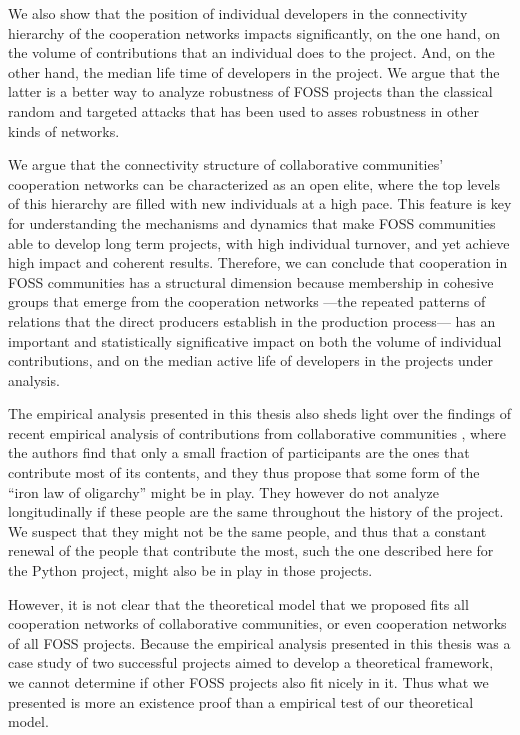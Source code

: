 We also show that the position of individual developers in the connectivity hierarchy of the cooperation networks impacts significantly, on the one hand, on the volume of contributions that an individual does to the project. And, on the other hand, the median life time of developers in the project. We argue that the latter is a better way to analyze robustness of FOSS projects than the classical random and targeted attacks that has been used to asses robustness in other kinds of networks.

We argue that the connectivity structure of collaborative communities' cooperation networks can be characterized as an open elite, where the top levels of this hierarchy are filled with new individuals at a high pace. This feature is key for understanding the mechanisms and dynamics that make FOSS communities able to develop long term projects, with high individual turnover, and yet achieve high impact and coherent results. Therefore, we can conclude that cooperation in FOSS communities has a structural dimension because membership in cohesive groups that emerge from the cooperation networks ---the repeated patterns of relations that the direct producers establish in the production process--- has an important and statistically significative impact on both the volume of individual contributions, and on the median active life of developers in the projects under analysis.

The empirical analysis presented in this thesis also sheds light over the findings of recent empirical analysis of contributions from collaborative communities \citep{shaw:2014}, where the authors find that only a small fraction of participants are the ones that contribute most of its contents, and they thus propose that some form of the ``iron law of oligarchy'' \citep{michels:1915} might be in play. They however do not analyze longitudinally if these people are the same throughout the history of the project. We suspect that they might not be the same people, and thus that a constant renewal of the people that contribute the most, such the one described here for the Python project, might also be in play in those projects. 

However, it is not clear that the theoretical model that we proposed fits all cooperation networks of collaborative communities, or even cooperation networks of all FOSS projects. Because the empirical analysis presented in this thesis was a case study of two successful projects aimed to develop a theoretical framework, we cannot determine if other FOSS projects also fit nicely in it. Thus what we presented is more an existence proof than a empirical test of our theoretical model.

